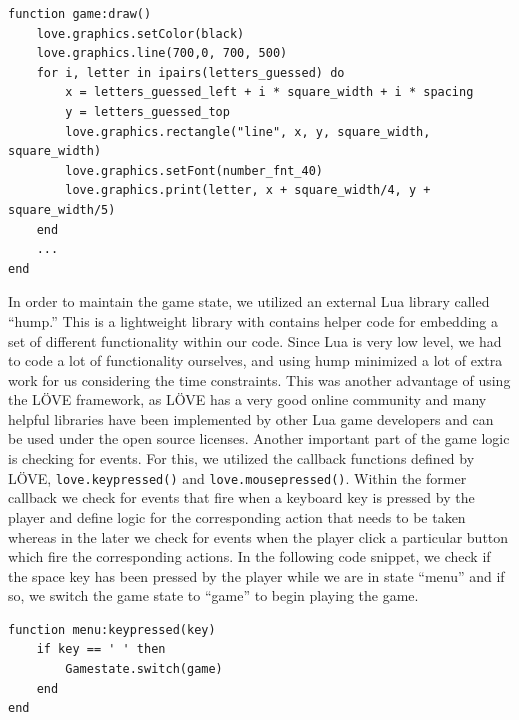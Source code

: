 \begin{lstlisting}[language={[5.2]Lua},caption=LuaLetterLizard \texttt{game:draw()} callback method, label=game]
function game:draw()
    love.graphics.setColor(black)
    love.graphics.line(700,0, 700, 500)
    for i, letter in ipairs(letters_guessed) do
        x = letters_guessed_left + i * square_width + i * spacing
        y = letters_guessed_top
        love.graphics.rectangle("line", x, y, square_width, square_width)
        love.graphics.setFont(number_fnt_40)
        love.graphics.print(letter, x + square_width/4, y + square_width/5)
    end
    ...
end
\end{lstlisting}

In order to maintain the game state, we utilized an external Lua library called ``hump.'' This is a lightweight library with contains helper code for embedding a set of different functionality within our code. Since Lua is very low level, we had to code a lot of functionality ourselves, and using hump minimized a lot of extra work for us considering the time constraints. This was another advantage of using the L\"OVE framework, as L\"OVE has a very good online community and many helpful libraries have been implemented by other Lua game developers and can be used under the open source licenses.
Another important part of the game logic is checking for events. For this, we utilized the callback functions defined by L\"OVE, \texttt{love.keypressed()} and \texttt{love.mousepressed()}. Within the former callback we check for events that fire when a keyboard key is pressed by the player and define logic for the corresponding action that needs to be taken whereas in the later we check for events when the player click a particular button which fire the corresponding actions. In the following code snippet, we check if the space key has been pressed by the player while we are in state ``menu'' and if so, we switch the game state to ``game'' to begin playing the game.
	
\begin{lstlisting}[language={[5.2]Lua},caption=Handling the keypressed event in LuaLetterLizard,label=keypressed]
function menu:keypressed(key)
    if key == ' ' then
        Gamestate.switch(game)
    end
end
\end{lstlisting}
